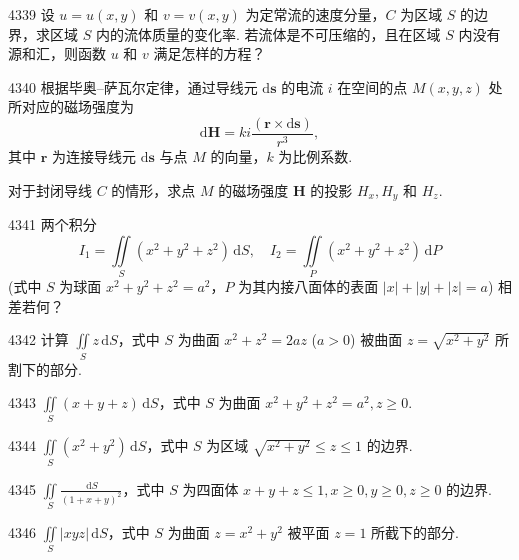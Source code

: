 \begin{prob}[M]{4339}
设 $u = u(x,y)$ 和 $v = v(x,y)$ 为定常流的速度分量，$C$ 为区域 $S$ 的边界，求区域 $S$ 内的流体质量的变化率. 若流体是不可压缩的，且在区域 $S$ 内没有源和汇，则函数 $u$ 和 $v$ 满足怎样的方程？
\end{prob}

\begin{prob}[M]{4340}
根据毕奥–萨瓦尔定律，通过导线元 $\mathrm{d}\boldsymbol{s}$ 的电流 $i$ 在空间的点 $M(x,y,z)$ 处所对应的磁场强度为
\[
\mathrm{d}\boldsymbol{H} = ki \frac{(\boldsymbol{r} \times \mathrm{d}\boldsymbol{s})}{r^3},
\]
其中 $\boldsymbol{r}$ 为连接导线元 $\mathrm{d}\boldsymbol{s}$ 与点 $M$ 的向量，$k$ 为比例系数.

对于封闭导线 $C$ 的情形，求点 $M$ 的磁场强度 $\boldsymbol{H}$ 的投影 $H_x, H_y$ 和 $H_z$.
\end{prob}


\begin{prob}[M]{4341}
两个积分
\[
I_1 = \iint\limits_S (x^2 + y^2 + z^2)\,\mathrm{d}S, \quad I_2 = \iint\limits_P (x^2 + y^2 + z^2)\,\mathrm{d}P
\]
(式中 $S$ 为球面 $x^2 + y^2 + z^2 = a^2$，$P$ 为其内接八面体的表面 $|x| + |y| + |z| = a$) 相差若何？
\end{prob}

\begin{prob}[M]{4342}
计算 $\iint\limits_S z\,\mathrm{d}S$，式中 $S$ 为曲面 $x^2 + z^2 = 2az$ ($a > 0$) 被曲面 $z = \sqrt{x^2 + y^2}$ 所割下的部分.
\end{prob}


\begin{prob}[S]{4343}
$\iint\limits_S (x + y + z)\,\mathrm{d}S$，式中 $S$ 为曲面 $x^2 + y^2 + z^2 = a^2, z \geqslant 0$.
\end{prob}

\begin{prob}[S]{4344}
$\iint\limits_S (x^2 + y^2)\,\mathrm{d}S$，式中 $S$ 为区域 $\sqrt{x^2 + y^2} \leqslant z \leqslant 1$ 的边界.
\end{prob}

\begin{prob}[S]{4345}
$\iint\limits_S \frac{\,\mathrm{d}S}{(1 + x + y)^2}$，式中 $S$ 为四面体 $x + y + z \leqslant 1, x \geqslant 0, y \geqslant 0, z \geqslant 0$ 的边界.
\end{prob}

\begin{prob}[S]{4346}
$\iint\limits_S |xyz|\,\mathrm{d}S$，式中 $S$ 为曲面 $z = x^2 + y^2$ 被平面 $z = 1$ 所截下的部分.
\end{prob}

